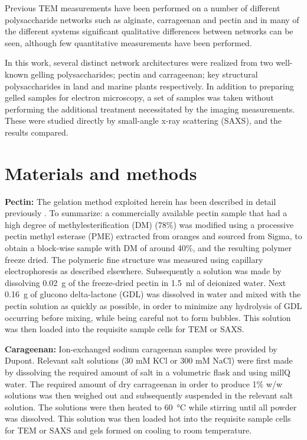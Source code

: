 Previous TEM measurements have been performed on a number of different polysaccharide networks such as alginate, carrageenan and pectin\cite{lundin_rheology_1997, brun_texture_2011, domozych_pectin_2014} and in many of the different systems significant qualitative differences between networks can be seen, although few quantitative measurements have been performed.

In this work, several distinct network architectures were realized from two well-known gelling polysaccharides; pectin and carrageenan; key structural polysaccharides in land and marine plants respectively. In addition to preparing gelled samples for electron microscopy, a set of samples was taken without performing the additional treatment necessitated by the imaging measurements. These were studied directly by small-angle x-ray scattering (SAXS), and the results compared.


\section{Materials and methods}
\textbf{Pectin: }The gelation method exploited herein has been described in detail previously \cite{mansel_zooming_2015}. To summarize: a commercially available pectin sample that had a high degree of methylesterification (DM) (78\%) was modified using a processive pectin methyl esterase (PME) extracted from oranges and sourced from Sigma, to obtain a block-wise sample with DM of around 40\%, and the resulting polymer freeze dried. The polymeric fine structure was measured using capillary electrophoresis as described elsewhere. Subsequently a solution was made by dissolving \SI{0.02}{\g} of the freeze-dried pectin in \SI{1.5}{\ml} of deionized water. Next \SI{0.16}{\g} of glucono delta-lactone (GDL) was dissolved in water and mixed with the pectin solution as quickly as possible, in order to minimize any hydrolysis of GDL occurring before mixing, while being careful not to form bubbles. This solution was then loaded into the requisite sample cells for TEM or SAXS.

\textbf{Carageenan: }Ion-exchanged sodium carageenan samples were provided by Dupont. Relevant salt solutions (30 mM KCl  or 300 mM NaCl) were first made by dissolving the required amount of salt in a volumetric flask and using millQ water. The required amount of dry carrageenan in order to produce 1\% w/w solutions was then weighed out and subsequently suspended in the relevant salt solution. The solutions were then heated to \SI{60}{\degreeCelsius} while stirring until all powder was dissolved. This solution was then loaded hot into the requisite sample cells for TEM or SAXS and gels formed on cooling to room temperature.

